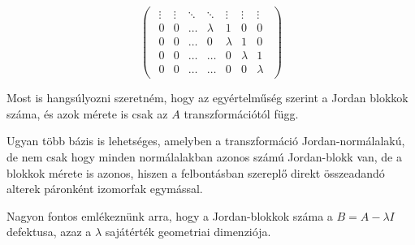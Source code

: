\documentclass[a4paper, showtrims]{memoir}
\theoremstyle{plain}
\theoremstyle{remark}
\theoremstyle{definition}
\begin{document}
\begin{displaymath}
\begin{pmatrix}
\begin{matrix}
			\vdots  & \vdots  & \ddots & \ddots  & \vdots  & \vdots  & \vdots  \\
			0       & 0       & \dots  & \lambda & 1       & 0       & 0       \\
			0       & 0       & \dots  & 0       & \lambda & 1       & 0       \\
			0       & 0       & \dots  & \dots   & 0       & \lambda & 1       \\
			0       & 0       & \dots  & \dots   & 0       & 0       & \lambda
		\end{matrix}
	\end{pmatrix}
\end{displaymath}

Most is hangsúlyozni szeretném, 
hogy az egyértelműség szerint a Jordan blokkok száma, és azok mérete is csak
az $A$ transzformációtól függ.

Ugyan több bázis is lehetséges, amelyben a transzformáció Jordan-normálalakú,
de nem csak hogy minden normálalakban azonos számú Jordan-blokk van,
de a blokkok mérete is azonos, hiszen 
a felbontásban szereplő direkt összeadandó alterek páronként izomorfak egymással.

Nagyon fontos emlékeznünk arra, hogy 
a Jordan-blokkok száma a $B=A-\lambda I$ defektusa, 
azaz a $\lambda$ sajátérték geometriai dimenziója.
\end{document}
